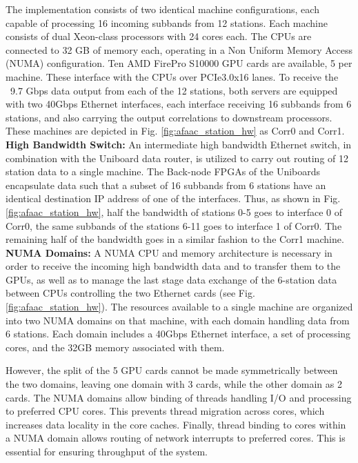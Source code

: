 \documentclass{ws-jai}
\begin{document}
The  implementation  consists  of  two identical  machine  configurations,  each
capable  of processing  16  incoming  subbands from  12  stations. Each  machine
consists  of  dual Xeon-class  processors  with  24  cores  each. The  CPUs  are
connected to  32 GB  of memory each,  operating in a  Non Uniform  Memory Access
(NUMA) configuration.   Ten AMD FirePro  S10000 GPU  cards are available,  5 per
machine. These  interface with the  CPUs over  PCIe3.0x16 lanes. To  receive the
~9.7 Gbps data  output from each of  the 12 stations, both  servers are equipped
with two 40Gbps Ethernet interfaces, each interface receiving 16 subbands from 6
stations,   and   also   carrying   the  output   correlations   to   downstream
processors. These  machines are  depicted in Fig.  \ref{fig:afaac_station_hw} as
Corr0 and Corr1.\\

\noindent  \textbf  {High  Bandwidth  Switch:} An  intermediate  high  bandwidth
Ethernet switch,  in combination with the  Uniboard data router, is  utilized to
carry out routing of  12 station data to a single  machine.  The Back-node FPGAs
of the  Uniboards encapsulate  data such  that a  subset of  16 subbands  from 6
stations   have  an   identical   destination   IP  address   of   one  of   the
interfaces. Thus, as  shown in Fig.  \ref{fig:afaac_station_hw},  half the bandwidth
of stations 0-5 goes to interface 0  of Corr0, the same subbands of the stations
6-11 goes to interface 1 of Corr0.   The remaining half of the bandwidth goes in
a similar fashion to the Corr1 machine.\\

\noindent  \textbf  {NUMA  Domains:}  A  NUMA CPU  and  memory  architecture  is
necessary in order  to receive the incoming high bandwidth  data and to transfer
them to  the GPUs,  as well as  to manage  the last stage  data exchange  of the
6-station  data   between  CPUs   controlling  the   two  Ethernet   cards  (see
Fig. \ref{fig:afaac_station_hw}).  The  resources available to a  single machine are
organized into two NUMA domains on  that machine, with each domain handling data
from 6  stations. Each  domain includes  a 40Gbps Ethernet  interface, a  set of
processing cores, and the 32GB  memory associated with them.

However, the split of  the 5 GPU cards cannot be  made symmetrically between the
two domains, leaving one domain with 3 cards, while the other domain as 2 cards.
The  NUMA domains  allow  binding  of threads  handling  I/O  and processing  to
preferred  CPU  cores.   This  prevents thread  migration  across  cores,  which
increases data  locality in the core  caches.  Finally, thread binding  to cores
within a  NUMA domain allows routing  of network interrupts to  preferred cores.
This is essential for ensuring throughput of the system.
\end{document}
